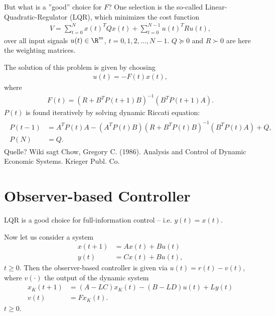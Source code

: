 But what is a ''good'' choice for $F$? One selection is the so-called Linear-Quadratic-Regulator (LQR), which minimizes the cost function 
\begin{align}
\label{eq: costFcn}
V = \sum_{t = 0}^N x(t)^T Q x(t) + \sum_{t = 0}^{N-1} u(t)^T R u(t),
\end{align}
over all  input signals $u(t) \in \R^m$, $t = 0,1,2, \dots, N-1$. 
$Q \succeq 0$ and $R \succ 0$ are here the weighting matrices. 

The solution of this problem is given by choosing
\begin{align}
u(t) = -F(t) x(t),
\end{align}
where 
\begin{align}
F(t) = (R +B^TP(t+1)B)^{-1}(B^TP(t+1)A).
\end{align}
$P(t)$ is found iteratively by solving dynamic Riccati equation: 
\begin{align}
\begin{split}
P(t-1) &= A^TP(t) A - (A^T P(t) B)(R + B^TP(t)B)^{-1}(B^T P(t)A) + Q,\\
P(N) &= Q.
\end{split}
\end{align}
{\color{red} Quelle? Wiki sagt Chow, Gregory C. (1986). Analysis and Control of Dynamic Economic Systems. Krieger Publ. Co.} 

\section{Observer-based Controller}
LQR is a good choice for full-information control -- i.e. $y(t) = x(t)$. 

Now let us consider a system 
\begin{align}
x(t+1) &= A x(t) + B u(t)\\
y(t)   &= C x(t) + B u(t),
\end{align}
$t \geq 0$. 
Then the observer-based controller is given via 
$u(t) = r(t) - v(t)$, where $v(\cdot)$ the output of the dynamic system
\begin{align}
x_K(t+1) & = (A - LC)x_K(t) - (B - LD) u(t) + Ly(t)\\
v(t) & = Fx_K(t).
\end{align}
$t \geq 0$. 
































 

